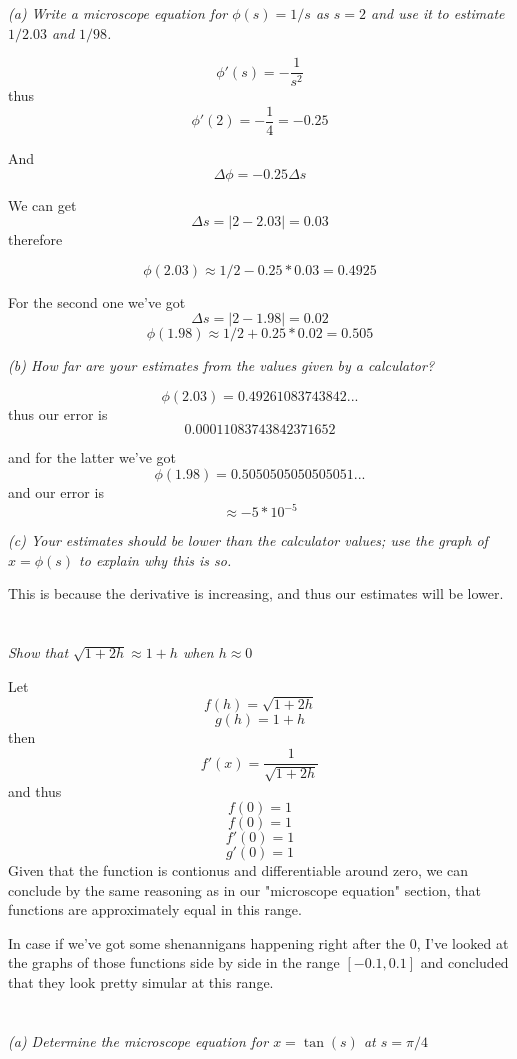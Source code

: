 \documentclass[11pt,oneside,titlepage]{book}
\begin{document}
\textit{(a) Write a microscope equation for $\phi(s) = 1/s$ as $s = 2$ and use it to estimate
  $1/2.03$ and $1/98$.}

$$\phi'(s) = -\frac{1}{s^2}$$
thus
$$\phi'(2) = -\frac{1}{4} = -0.25$$

And
$$\Delta \phi = -0.25 \Delta s$$

We can get
$$\Delta s = |2 - 2.03| = 0.03$$
therefore

$$\phi(2.03) \approx 1/2 - 0.25 * 0.03 = 0.4925$$

For the second one we've got
$$\Delta s = |2 - 1.98| = 0.02$$
$$\phi(1.98) \approx 1/2 + 0.25 * 0.02 = 0.505$$

\textit{(b) How far are your estimates from the values given by a calculator?}

$$\phi(2.03) = 0.49261083743842...$$
thus our error is
$$0.00011083743842371652$$

and for the latter we've got
$$\phi(1.98) = 0.5050505050505051...$$
and our error is
$$\approx -5 * 10^{-5}$$

\textit{(c) Your estimates should be lower than the calculator values; use the graph of
  $x = \phi(s)$ to explain why this is so.}

This is because the derivative is increasing, and thus our estimates will be lower.


\section{}

\textit{Show that $\sqrt{1 + 2h} \approx 1 + h$ when $h \approx 0$}

Let
$$f(h) = \sqrt{1 + 2h}$$
$$g(h) = 1 + h$$
then
$$f'(x) = \frac{1}{\sqrt{1 + 2h}}$$
and thus
$$f(0) = 1$$
$$f(0) = 1$$
$$f'(0) = 1$$
$$g'(0) = 1$$
Given that the function is contionus and differentiable around zero, we can conclude by the
same reasoning as in our  "microscope equation" section, that functions are approximately
equal in this range.

In case if we've got some shenannigans happening right after the 0, I've looked at the graphs
of those functions side by side in the range $[-0.1, 0.1]$ and concluded that they look pretty
simular at this range.

\section{}

\textit{(a) Determine the microscope equation for $x = \tan(s)$ at $s = \pi/4$}
\end{document}

